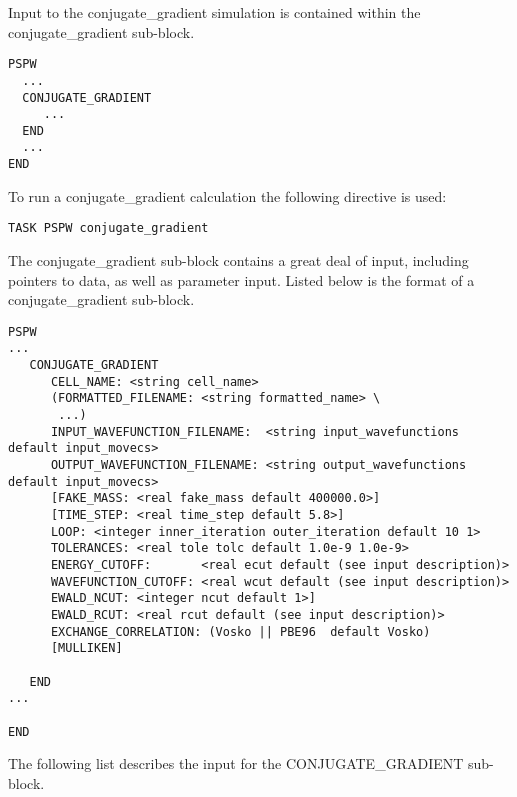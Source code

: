 Input to the conjugate\_gradient simulation is contained
within the conjugate\_gradient sub-block.
\begin{verbatim}
PSPW
  ...
  CONJUGATE_GRADIENT
     ...
  END
  ...
END
\end{verbatim}
To run a conjugate\_gradient calculation the following directive is used:
\begin{verbatim}
TASK PSPW conjugate_gradient 
\end{verbatim}
The conjugate\_gradient sub-block contains a great deal
of input, including pointers to data, as well as
parameter input.  Listed below is the format of a conjugate\_gradient sub-block.
\begin{verbatim}
PSPW
...
   CONJUGATE_GRADIENT
      CELL_NAME: <string cell_name>
      (FORMATTED_FILENAME: <string formatted_name> \
       ...)
      INPUT_WAVEFUNCTION_FILENAME:  <string input_wavefunctions  default input_movecs>
      OUTPUT_WAVEFUNCTION_FILENAME: <string output_wavefunctions default input_movecs>
      [FAKE_MASS: <real fake_mass default 400000.0>]
      [TIME_STEP: <real time_step default 5.8>]
      LOOP: <integer inner_iteration outer_iteration default 10 1>
      TOLERANCES: <real tole tolc default 1.0e-9 1.0e-9>
      ENERGY_CUTOFF:       <real ecut default (see input description)>
      WAVEFUNCTION_CUTOFF: <real wcut default (see input description)>
      EWALD_NCUT: <integer ncut default 1>]
      EWALD_RCUT: <real rcut default (see input description)>
      EXCHANGE_CORRELATION: (Vosko || PBE96  default Vosko)
      [MULLIKEN]

   END
...

END
\end{verbatim}
The following list describes the input for the CONJUGATE\_GRADIENT
sub-block.
